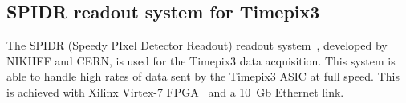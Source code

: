 









\subsection{SPIDR readout system for Timepix3}\label{sec:TimepixReadout}

The SPIDR (Speedy PIxel Detector Readout) readout
system~\cite{Visser:2015bsa}, developed by NIKHEF and CERN, is used
for the Timepix3 data acquisition. This system is able to handle high
rates of data sent by the Timepix3 ASIC at full speed. This is
achieved with Xilinx Virtex-7 FPGA~\cite{XilinxVirtex7} and a 10~Gb
Ethernet link.

